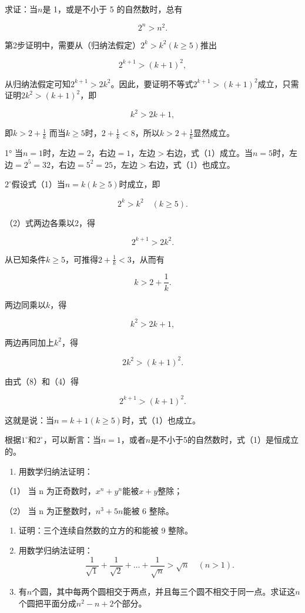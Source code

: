 求证：当\(n\)是 1，或是不小于 5 的自然数时，总有

\[
2^{n} > n^{2}. \tag {1}
\]

第2步证明中，需要从（归纳法假定）\(2^{k}>k^{2}(k\geqslant5)\)推出

\[
2^{k + 1} > (k + 1)^{2},
\]

从归纳法假定可知\(2^{k + 1} > 2k^2\)。因此，要证明不等式\(2^{k + 1} > (k + 1)^2\)成立，只需证明\(2k^2 > (k + 1)^2\)，即

\[
k^{2} > 2 k + 1,
\]

即\(k > 2 + \frac{1}{k}\)
而当\(k \geqslant 5\)时，\(2 + \frac{1}{k} < 8\)，所以\(k > 2 + \frac{1}{k}\)显然成立。

 1°
当\(n = 1\)时，左边\(= 2\)，右边\(= 1\)，左边\(>\)右边，式（1）成立。当\(n = 5\)时，左边\(= 2^5 = 32\)，右边\(= 5^2 = 25\)，左边\(>\)右边，式（1）也成立。

\(2^{\circ}\)假设式（1）当\(n = k (k \geqslant 5)\)时成立，即

\[
2^{k} > k^{2} \quad (k \geqslant 5). \tag {2}
\]

（2）式两边各乘以2，得

\[
2^{k + 1} > 2 k^{2}. \tag {3}
\]

从已知条件\(k \geqslant 5\)，可推得\(2 + \frac{1}{k} < 3\)，从而有

\[
k > 2 + \frac{1}{k}.
\]

两边同乘以\(k\)，得

\[
k^{2} > 2 k + 1,
\]

两边再同加上\(k^2\)，得

\[
2 k^{2} > (k + 1)^{2}. \tag {4}
\]

由式（8）和（4）得

\[
2^{k + 1} > (k + 1)^{2}.
\]

这就是说：当\(n = k + 1 (k \geqslant 5)\)时，式（1）也成立。

根据\(1^{\circ}\)和\(2^{\circ}\)，可以断言：当\(n = 1\)，或者\(n\)是不小于5的自然数时，式（1）是恒成立的。

\begin{enumerate}
\item
  用数学归纳法证明：
\end{enumerate}

（1） 当 n 为正奇数时，\(x^{n} + y^{n}\)能被\(x + y\)整除；

（2） 当 n 为正整数时，\(n^{3}+5n\)能被 6 整除。

\begin{enumerate}[start=2]
\item
  证明：三个连续自然数的立方的和能被 9 整除。
\item
  用数学归纳法证明：
\[
\frac{1}{\sqrt{1}} + \frac{1}{\sqrt{2}} + \dots + \frac{1}{\sqrt{n}} > \sqrt{n} \quad (n > 1).
\]
\item
  有\(n\)个圆，其中每两个圆相交于两点，并且每三个圆不相交于同一点。求证这\(n\)个圆把平面分成\(n^2 - n + 2\)个部分。
\end{enumerate}

